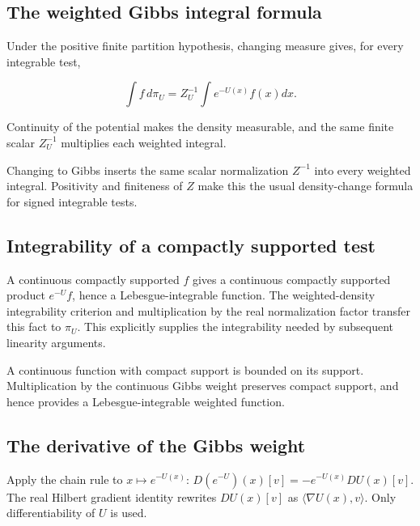\documentclass[11pt,a4paper]{article}
\begin{document}
\subsection{\texorpdfstring{The weighted Gibbs integral formula}{The weighted Gibbs integral formula}}


Under the positive finite partition hypothesis, changing measure gives, for every integrable test,

\[\int f\,d\pi_U=Z_U^{-1}\int e^{-U(x)}f(x)dx.\]

 Continuity of the potential makes the density measurable, and the same finite scalar \(Z_U^{-1}\) multiplies each weighted integral.



Changing to Gibbs inserts the same scalar normalization \(Z^{-1}\) into every weighted integral. Positivity and finiteness of \(Z\) make this the usual density-change formula for signed integrable tests.


\subsection{\texorpdfstring{Integrability of a compactly supported test}{Integrability of a compactly supported test}}


A continuous compactly supported \(f\) gives a continuous compactly supported product \(e^{-U}f\), hence a Lebesgue-integrable function. The weighted-density integrability criterion and multiplication by the real normalization factor transfer this fact to \(\pi_U\). This explicitly supplies the integrability needed by subsequent linearity arguments.



A continuous function with compact support is bounded on its support. Multiplication by the continuous Gibbs weight preserves compact support, and hence provides a Lebesgue-integrable weighted function.


\subsection{\texorpdfstring{The derivative of the Gibbs weight}{The derivative of the Gibbs weight}}


Apply the chain rule to \(x\mapsto e^{-U(x)}\): \(D(e^{-U})(x)[v]=-e^{-U(x)}DU(x)[v]\). The real Hilbert gradient identity rewrites \(DU(x)[v]\) as \(\langle\nabla U(x),v\rangle\). Only differentiability of \(U\) is used.
\end{document}
